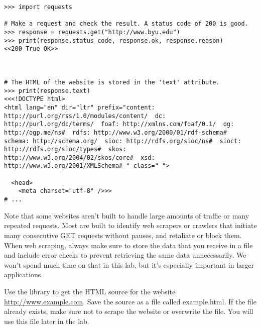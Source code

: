 \begin{lstlisting}
>>> import requests

# Make a request and check the result. A status code of 200 is good.
>>> response = requests.get("http://www.byu.edu")
>>> print(response.status_code, response.ok, response.reason)
<<200 True OK>>



# The HTML of the website is stored in the 'text' attribute.
>>> print(response.text)
<<<!DOCTYPE html>
<html lang="en" dir="ltr" prefix="content: http://purl.org/rss/1.0/modules/content/  dc: http://purl.org/dc/terms/  foaf: http://xmlns.com/foaf/0.1/  og: http://ogp.me/ns#  rdfs: http://www.w3.org/2000/01/rdf-schema#  schema: http://schema.org/  sioc: http://rdfs.org/sioc/ns#  sioct: http://rdfs.org/sioc/types#  skos: http://www.w3.org/2004/02/skos/core#  xsd: http://www.w3.org/2001/XMLSchema# " class=" ">

  <head>
    <meta charset="utf-8" />>>
# ...
\end{lstlisting}

Note that some websites aren't built to handle large amounts of traffic or many repeated requests.
Most are built to identify web scrapers or crawlers that initiate many consecutive GET requests without pauses, and retaliate or block them.
When web scraping, always make sure to store the data that you receive in a file and include error checks to prevent retrieving the same data unnecessarily.
We won't spend much time on that in this lab, but it's especially important in larger applications.

\begin{problem}
Use the  library to get the HTML source for the website \url{http://www.example.com}.
Save the source as a file called example.html.
If the file already exists, make sure not to scrape the website or overwrite the file.
You will use this file later in the lab.
\label{prob:get-example.com}
\end{problem}

